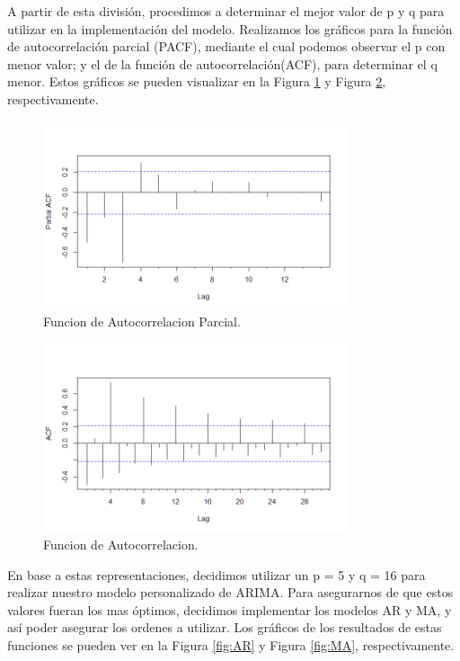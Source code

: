 \documentclass{article} %
\begin{document}
A partir de esta división, procedimos a determinar el mejor valor de p y q para utilizar en la implementación del modelo. Realizamos los gráficos para la función de autocorrelación parcial (PACF), mediante el cual podemos observar el p con menor valor; y el de la función de autocorrelación(ACF), para determinar el q menor. Estos gráficos se pueden visualizar en la Figura \ref{fig:PACF} y Figura \ref{fig:ACF}, respectivamente. 

\begin{figure}[H]
	\centering
	\includegraphics[width=0.8\textwidth]{images/4-8 PACF}
	\caption{Funcion de Autocorrelacion Parcial.}
	\label{fig:PACF}
\end{figure} 
\begin{figure}[H]
	\centering
	\includegraphics[width=0.8\textwidth]{images/4-9 ACF}
	\caption{Funcion de Autocorrelacion.}
	\label{fig:ACF}
\end{figure} 


En base a estas representaciones, decidimos utilizar un p = 5 y q = 16 para realizar nuestro modelo personalizado de ARIMA. Para asegurarnos de que estos valores fueran los mas óptimos, decidimos implementar los modelos AR y MA, y así poder asegurar los ordenes a utilizar. Los gráficos de los resultados de estas funciones se pueden ver en la Figura \ref{fig:AR} y Figura \ref{fig:MA}, respectivamente.
\end{document}
